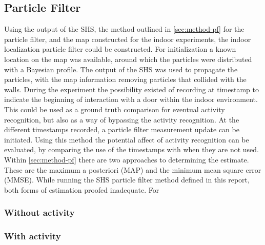 \subsection{Particle Filter}
Using the output of the SHS, the method outlined in \cref{sec:method-pf} for the particle filter, and the map constructed for the indoor experiments, the indoor localization particle filter could be constructed. For initialization a known location on the map was available, around which the particles were distributed with a Bayesian profile. The output of the SHS was used to propagate the particles, with the map information removing particles that collided with the walls.  During the experiment the possibility existed of recording at timestamp to indicate the beginning of interaction with a door within the indoor environment. This could be used as a ground truth comparison for eventual activity recognition, but also as a way of bypassing the activity recognition. At the different timestamps recorded, a particle filter measurement update can be initiated. Using this method the potential affect of activity recognition can be evaluated, by comparing the use of the timestamps with when they are not used. \\
Within \cref{sec:method-pf} there are two approaches to determining the estimate. These are the maximum a posteriori (MAP) and the minimum mean square error (MMSE). While running the SHS particle filter method defined in this report, both forms of estimation proofed inadequate. For  

\subsubsection{Without activity}

\subsubsection{With activity}


